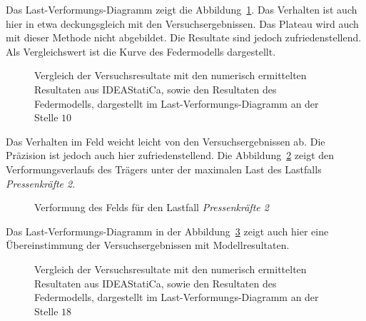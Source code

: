 \documentclass[
  11pt,
  letterpaper,
]{scrreprt}
\begin{document}
Das Last-Verformungs-Diagramm zeigt die
Abbildung~\ref{fig-p_w10_vergleich_idea}. Das Verhalten ist auch hier in
etwa deckungsgleich mit den Versuchsergebnissen. Das Plateau wird auch
mit dieser Methode nicht abgebildet. Die Resultate sind jedoch
zufriedenstellend. Als Vergleichswert ist die Kurve des Federmodells
dargestellt.

\begin{figure}[H]


\caption{\label{fig-p_w10_vergleich_idea}Vergleich der Versuchsresultate
mit den numerisch ermittelten Resultaten aus IDEAStatiCa, sowie den
Resultaten des Federmodells, dargestellt im Last-Verformungs-Diagramm an
der Stelle \(10\)}

\end{figure}%

Das Verhalten im Feld weicht leicht von den Versuchsergebnissen ab. Die
Präzision ist jedoch auch hier zufriedenstellend. Die
Abbildung~\ref{fig-def_feld_ideastat} zeigt den Verformungsverlaufs des
Trägers unter der maximalen Last des Lastfalls \emph{Pressenkräfte 2}.

\begin{figure}[H]


\caption{\label{fig-def_feld_ideastat}Verformung des Felds für den
Lastfall \emph{Pressenkräfte 2}}

\end{figure}%

Das Last-Verformungs-Diagramm in der
Abbildung~\ref{fig-q_w18_vergleich_idea} zeigt auch hier eine
Übereinstimmung der Versuchsergebnissen mit Modellresultaten.

\begin{figure}[H]


\caption{\label{fig-q_w18_vergleich_idea}Vergleich der Versuchsresultate
mit den numerisch ermittelten Resultaten aus IDEAStatiCa, sowie den
Resultaten des Federmodells, dargestellt im Last-Verformungs-Diagramm an
der Stelle \(18\)}

\end{figure}%
\end{document}
